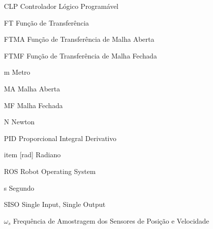 \documentclass[12pt,oneside,a4paper, chapter=TITLE, section = TITLE, english, brazil]{abntex2}
\begin{document}
\begin{siglas}

  \item [CLP] Controlador Lógico Programável
  
  \item [FT] Função de Transferência
  
  \item [FTMA] Função de Transferência de Malha Aberta
  
  \item [FTMF] Função de Transferência de Malha Fechada
  
  \item [m] Metro
  
  \item [MA] Malha Aberta
  
  \item [MF] Malha Fechada
  
  \item [N] Newton
  
  \item [PID] Proporcional Integral Derivativo
  
  item [rad] Radiano
  
  \item [ROS] Robot Operating System
  
  \item [s] Segundo
  
  \item [SISO] Single Input, Single Output
  
  \item [$\omega$$_{s}$] Frequência de Amostragem dos Sensores de Posição e Velocidade
      
  \end{siglas}


\tableofcontents*
\cleardoublepage
\end{document}

